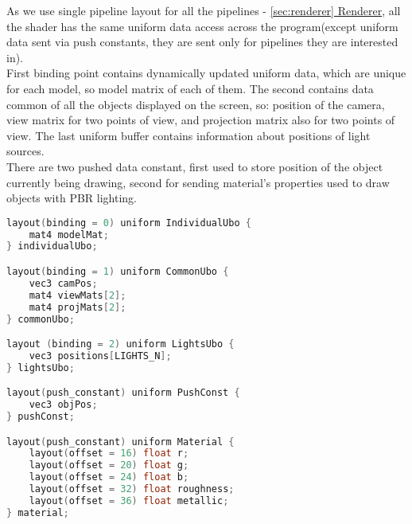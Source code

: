 As we use single pipeline layout for all the pipelines - \hyperref[sec:renderer]{\ref*{sec:renderer} Renderer}, all the shader has the same uniform data access across the program(except uniform data sent via push constants, they are sent only for pipelines they are interested in).\\
First binding point contains dynamically updated uniform data, which are unique for each model, so model matrix of each of them. The second contains data common of all the objects displayed on the screen, so: position of the camera, view matrix for two points of view, and projection matrix also for two points of view. The last uniform buffer contains information about positions of light sources.\\There are two pushed data constant, first used to store position of the object currently being drawing, second for sending material's properties used to draw objects with PBR lighting.
\begin{lstlisting}[language=c++, caption=Common a shader data]
layout(binding = 0) uniform IndividualUbo {
    mat4 modelMat;
} individualUbo;

layout(binding = 1) uniform CommonUbo {
    vec3 camPos;
    mat4 viewMats[2];
    mat4 projMats[2];
} commonUbo;

layout (binding = 2) uniform LightsUbo {
    vec3 positions[LIGHTS_N];
} lightsUbo;

layout(push_constant) uniform PushConst {
    vec3 objPos;
} pushConst;

layout(push_constant) uniform Material {
    layout(offset = 16) float r;
    layout(offset = 20) float g;
    layout(offset = 24) float b;
    layout(offset = 32) float roughness;
    layout(offset = 36) float metallic;
} material;
\end{lstlisting}

